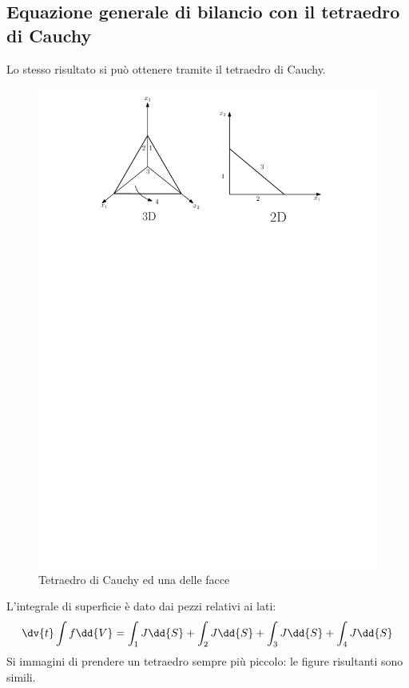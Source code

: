 \subsection{Equazione generale di bilancio con il tetraedro di Cauchy}
Lo stesso risultato si può ottenere tramite il tetraedro di Cauchy.
%
	\begin{figure}[ht]
		\includegraphics[scale=0.8]{./1.4 Equazioni di bilancio/1.4-6}
		\centering
		\caption{Tetraedro di Cauchy ed una delle facce}
	\end{figure}
%
L'integrale di superficie è dato dai pezzi relativi ai lati:
%
	\begin{equation*}
		\dv{t} \int {f \dd{V}} = \int_1 {J \dd{S}} + \int_2{J \dd{S}} + \int_3 {J \dd{S}} + \int_4 {J \dd{S}}
	\end{equation*}
%
Si immagini di prendere un tetraedro sempre più piccolo: le figure risultanti sono simili.
